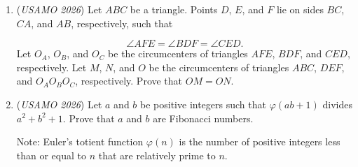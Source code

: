 \begin{enumerate}
 

	\item (\textit{USAMO 2026}) Let $ABC$ be a triangle. Points $D$, $E$, and $F$ lie on sides $BC$, $CA$, and $AB$, respectively, such that

 \[\angle AFE=\angle BDF=\angle CED.\]
Let $O_A$, $O_B$, and $O_C$ be the circumcenters of triangles $AFE$, $BDF$, and $CED$, respectively. Let $M$, $N$, and $O$ be the circumcenters of triangles $ABC$, $DEF$, and $O_AO_BO_C$, respectively. Prove that $OM=ON$.


 

	\item (\textit{USAMO 2026}) Let $a$ and $b$ be positive integers such that $\varphi(ab+1)$ divides $a^2+b^2+1$. Prove that $a$ and $b$ are Fibonacci numbers.


 Note: Euler’s totient function $\varphi(n)$ is the number of positive integers less than
or equal to $n$ that are relatively prime to $n$.


 

\end{enumerate}